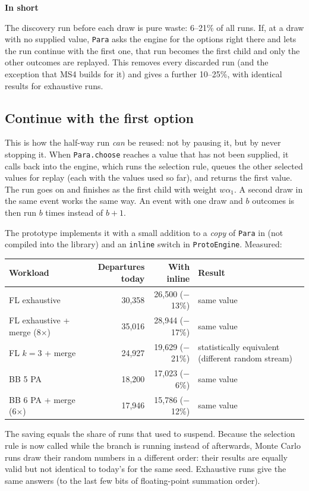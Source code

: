 \documentclass[11pt]{article}
\newcommand{\code}[1]{\texttt{#1}}
\newcommand{\shadedbox}[3]{\par\smallskip\noindent\colorbox{#1}{\parbox{\dimexpr\linewidth-2\fboxsep}{\textbf{#2}\par #3}}\par\smallskip}
\newcommand{\takeaway}[1]{\shadedbox{okbg}{In short}{#1}}
\begin{document}
\takeaway{The discovery run before each draw is pure waste: 6--21\% of all runs. If, at a draw with no supplied value,
\code{Para} asks the engine for the options right there and lets the run continue with the first one, that run becomes
the first child and only the other outcomes are replayed. This removes every discarded run (and the exception that
MS4 builds for it) and gives a further 10--25\%, with identical results for exhaustive runs.}

\subsection{Continue with the first option}
This is how the half-way run \emph{can} be reused: not by pausing it, but by never stopping it. When \code{Para.choose}
reaches a value that has not been supplied, it calls back into the engine, which runs the selection rule, queues the
other selected values for replay (each with the values used so far), and returns the first value. The run goes on and
finishes as the first child with weight $w\alpha_1$. A second draw in the same event works the same way. An event with
one draw and $b$ outcomes is then run $b$ times instead of $b+1$.

The prototype implements it with a small addition to a \emph{copy} of \code{Para} in  (not
compiled into the library) and an \code{inline} switch in \code{ProtoEngine}. Measured:
\begin{center}\small
\begin{tabularx}{\linewidth}{@{}lRRY@{}}
\toprule
\textbf{Workload} & \textbf{Departures today} & \textbf{With inline} & \textbf{Result}\\
\midrule
FL exhaustive        & 30{,}358 & 26{,}500 ($-$13\%) & same value\\
FL exhaustive + merge (8$\times$) & 35{,}016 & 28{,}944 ($-$17\%) & same value\\
FL $k{=}3$ + merge   & 24{,}927 & 19{,}629 ($-$21\%) & statistically equivalent (different random stream)\\
BB 5 PA              & 18{,}200 & 17{,}023 ($-$6\%)  & same value\\
BB 6 PA + merge (6$\times$) & 17{,}946 & 15{,}786 ($-$12\%) & same value\\
\bottomrule
\end{tabularx}
\end{center}
The saving equals the share of runs that used to suspend. Because the selection rule is now called while the branch
is running instead of afterwards, Monte Carlo runs draw their random numbers in a different order: their results are
equally valid but not identical to today's for the same seed. Exhaustive runs give the same answers (to the last few
bits of floating-point summation order).
\end{document}
